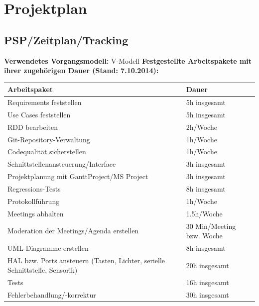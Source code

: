 \documentclass[oneside,a4paper,titlepage]{scrartcl} %
\begin{document}
\newpage

\section{Projektplan}

\subsection{PSP/Zeitplan/Tracking}
\textbf{Verwendetes Vorgangsmodell:} V-Modell\newline
\newline
\textbf{Festgestellte Arbeitspakete mit ihrer zugehörigen Dauer (Stand: 7.10.2014):}\newline
\newline
 \begin{small}
  \begin{tabular}{|p{8cm}|L{5cm}|}
   \hline
   \textbf{Arbeitspaket} & \textbf{Dauer}\\
   \hline
   Requirements feststellen & 5h insgesamt\\
   \hline
   Use Cases feststellen & 5h insgesamt\\
   \hline
   RDD bearbeiten & 2h/Woche\\
   \hline
   Git-Repository-Verwaltung & 1h/Woche\\
   \hline
   Codequalität sicherstellen & 1h/Woche\\
   \hline
   Schnittstellenansteuerung/Interface & 3h insgesamt\\
   \hline
   Projektplanung mit GanttProject/MS Project & 3h insgesamt\\
   \hline
   Regressions-Tests & 8h insgesamt\\
   \hline
   Protokollführung & 1h/Woche\\
   \hline
   Meetings abhalten & 1.5h/Woche\\
   \hline
   Moderation der Meetings/Agenda erstellen & 30 Min/Meeting bzw. Woche\\
   \hline
   UML-Diagramme erstellen & 8h insgesamt\\
   \hline
   HAL bzw. Ports ansteuern (Tasten, Lichter, serielle Schnittstelle, Sensorik) & 20h insgesamt\\
   \hline
   Tests & 16h insgesamt\\
   \hline
   Fehlerbehandlung/-korrektur & 30h insgesamt\\
   \hline
  \end{tabular}
\end{small}
\end{document}
